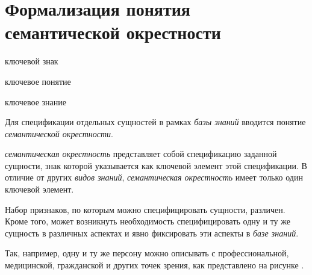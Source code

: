 \section{Формализация понятия семантической окрестности}
\label{sec_sem_neighborhood}

\begin{SCn}
	\begin{scnrelfromlist}{ключевой знак}
	\end{scnrelfromlist}
\end{SCn}

\begin{SCn}
	\begin{scnrelfromlist}{ключевое понятие}
	\end{scnrelfromlist}
\end{SCn}

\begin{SCn}
	\begin{scnrelfromlist}{ключевое знание}
	\end{scnrelfromlist}
\end{SCn}

Для спецификации отдельных сущностей в рамках \textit{базы знаний} вводится понятие \textit{семантической окрестности}. 

\textit{семантическая окрестность} представляет собой спецификацию заданной сущности, знак которой указывается как ключевой элемент этой спецификации. В отличие от других \textit{видов знаний}, \textit{семантическая окрестность} имеет только один ключевой элемент.

Набор признаков, по которым можно специфицировать сущности, различен. Кроме того, может возникнуть необходимость специфицировать одну и ту же сущность в различных аспектах и явно фиксировать эти аспекты в \textit{базе знаний}.

Так, например, одну и ту же персону можно описывать с профессиональной, медицинской, гражданской и других точек зрения, как представлено на рисунке \textit{}. 

